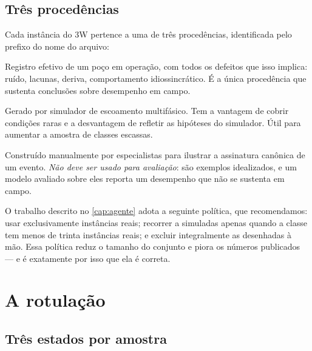 \subsection{Três procedências}

Cada instância do 3W pertence a uma de três procedências, identificada pelo prefixo do
nome do arquivo:

\begin{description}[leftmargin=0pt,style=nextline,itemsep=0.5em]

\item[Real (\texttt{WELL-\dots}).] Registro efetivo de um poço em operação, com todos
os defeitos que isso implica: ruído, lacunas, deriva, comportamento idiossincrático.
É a única procedência que sustenta conclusões sobre desempenho em campo.

\item[Simulado (\texttt{SIMULATED-\dots}).] Gerado por simulador de escoamento
multifásico. Tem a vantagem de cobrir condições raras e a desvantagem de refletir as
hipóteses do simulador. Útil para aumentar a amostra de classes escassas.

\item[Desenhado à mão (\texttt{DRAWN-\dots}).] Construído manualmente por especialistas
para ilustrar a assinatura canônica de um evento. \emph{Não deve ser usado para
avaliação}: são exemplos idealizados, e um modelo avaliado sobre eles reporta um
desempenho que não se sustenta em campo.

\end{description}

\begin{destaque}
O trabalho descrito no \cref{cap:agente} adota a seguinte política, que recomendamos:
usar exclusivamente instâncias reais; recorrer a simuladas apenas quando a classe tem
menos de trinta instâncias reais; e excluir integralmente as desenhadas à mão. Essa
política reduz o tamanho do conjunto e piora os números publicados --- e é exatamente
por isso que ela é correta.
\end{destaque}

\section{A rotulação}

\subsection{Três estados por amostra}

